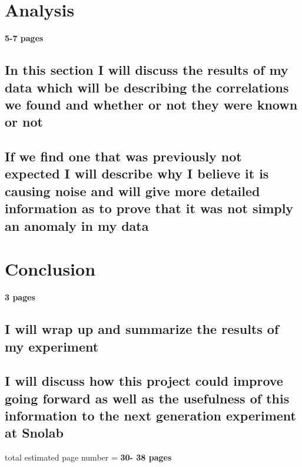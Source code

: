 \section{Analysis} \textbf{5-7 pages}
\subsection{In this section I will discuss the results of my data which will be describing the correlations we found and whether or not they were known or not}
\subsection{If we find one that was previously not expected I will describe why I believe it is causing noise and will give more detailed information as to prove that it was not simply an anomaly in my data}
\section{Conclusion} \textbf{3 pages}
\subsection{I will wrap up and summarize the results of my experiment} 

\subsection{I will discuss how this project could improve going forward as well as the usefulness of this information to the next generation experiment at Snolab}


total estimated page number = \textbf{30- 38 pages}
